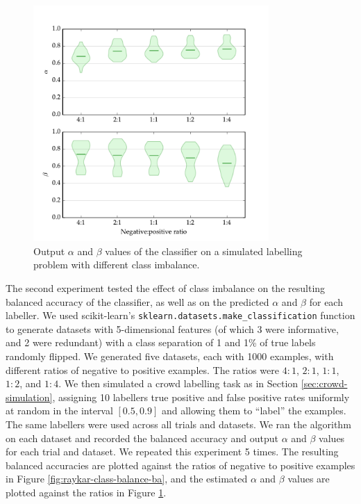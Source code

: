             \begin{figure}
                \centering
                \includegraphics[width=0.8\textwidth]
                    {images/experiments/raykar_class_balance}
                \caption{Output $\alpha$ and $\beta$ values of the
                    \citeauthor{raykar10} classifier on a simulated labelling
                    problem with different class imbalance.}
                \label{fig:raykar-class-balance-ab}
            \end{figure}

            The second experiment tested the effect of class imbalance on the
            resulting balanced accuracy of the classifier, as well as on the
            predicted $\alpha$ and $\beta$ for each labeller. We used
            scikit-learn's \texttt{sklearn.datasets.make\_classification}
            function \citep{scikit-learn} to generate datasets with
            5-dimensional features (of which 3 were informative, and 2 were
            redundant) with a class separation of 1 and 1\% of true labels
            randomly flipped. We generated five datasets, each with 1000
            examples, with different ratios of negative to positive examples.
            The ratios were $4:1$, $2:1$, $1:1$, $1:2$, and $1:4$. We then
            simulated a crowd labelling task as in Section
            \ref{sec:crowd-simulation}, assigning 10 labellers true positive and
            false positive rates uniformly at random in the interval $[0.5,
            0.9]$ and allowing them to ``label'' the examples. The same
            labellers were used across all trials and datasets. We ran the
            \citeauthor{raykar10} algorithm on each dataset and recorded the
            balanced accuracy and output $\alpha$ and $\beta$ values for each
            trial and dataset. We repeated this experiment 5 times. The
            resulting balanced accuracies are plotted against the ratios of
            negative to positive examples in Figure
            \ref{fig:raykar-class-balance-ba}, and the estimated $\alpha$ and
            $\beta$ values are plotted against the ratios in Figure
            \ref{fig:raykar-class-balance-ab}.

